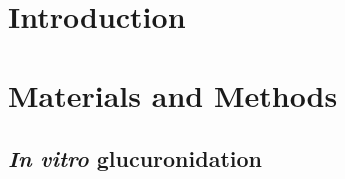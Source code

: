 \section{Introduction}





\section{Materials and Methods}
	\subsection{\textit{In vitro} glucuronidation}
	\cite{Liu1984}
	
